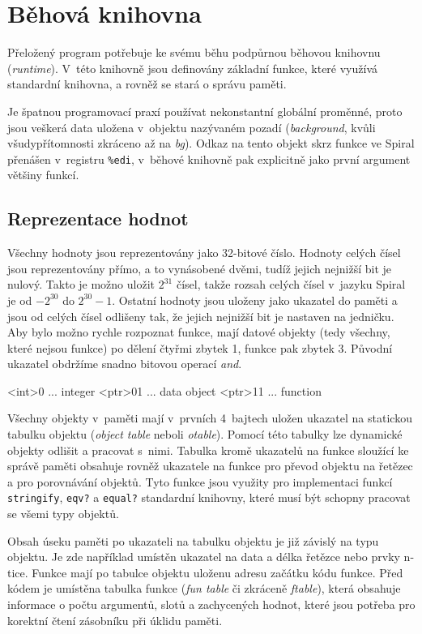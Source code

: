 \chapter{Běhová knihovna}

Přeložený program potřebuje ke svému běhu podpůrnou běhovou knihovnu
(\emph{runtime}). V~této knihovně jsou definovány základní funkce, které využívá
standardní knihovna, a rovněž se stará o správu paměti.

Je špatnou programovací praxí používat nekonstantní globální proměnné, proto
jsou veškerá  data uložena v~objektu nazývaném pozadí
(\emph{background}, kvůli všudypřítomnosti zkráceno až na \emph{bg}). Odkaz na
tento objekt skrz funkce ve Spiral přenášen v~registru \texttt{\%edi}, v~běhové
knihovně pak explicitně jako první argument většiny funkcí.

\section{Reprezentace hodnot}

Všechny hodnoty jsou reprezentovány jako 32-bitové číslo. Hodnoty celých čísel
jsou reprezentovány přímo, a to vynásobené dvěmi, tudíž jejich nejnižší bit je
nulový. Takto je možno uložit $2^{31}$ čísel, takže rozsah celých čísel v~jazyku
Spiral je od $-2^{30}$ do $2^{30}-1$. Ostatní hodnoty jsou uloženy jako ukazatel
do paměti a jsou od celých čísel odlišeny tak, že jejich nejnižší bit je
nastaven na jedničku. Aby bylo možno rychle rozpoznat funkce, mají datové
objekty (tedy všechny, které nejsou funkce) po dělení čtyřmi zbytek 1, funkce
pak zbytek 3.  Původní ukazatel obdržíme snadno bitovou operací \emph{and}.

\begin{ttcode}
   <int>0 ... integer
  <ptr>01 ... data object
  <ptr>11 ... function
\end{ttcode}

Všechny objekty v~paměti mají v~prvních 4~bajtech uložen ukazatel na statickou
tabulku objektu (\emph{object table} neboli \emph{otable}). Pomocí této tabulky
lze dynamické objekty odlišit a pracovat s~nimi. Tabulka kromě ukazatelů na
funkce sloužící ke správě paměti obsahuje rovněž ukazatele na funkce pro převod
objektu na řetězec a pro porovnávání objektů. Tyto funkce jsou využity pro
implementaci funkcí \texttt{stringify}, \texttt{eqv?} a \texttt{equal?}
standardní knihovny, které musí být schopny pracovat se všemi typy objektů.

Obsah úseku paměti po ukazateli na tabulku objektu je již závislý na typu
objektu. Je zde například umístěn ukazatel na data a délka řetězce nebo prvky
n-tice. Funkce mají po tabulce objektu uloženu adresu začátku kódu funkce. Před
kódem je umístěna tabulka funkce (\emph{fun table} či zkráceně \emph{ftable}),
která obsahuje informace o počtu argumentů, slotů a zachycených hodnot, které
jsou potřeba pro korektní čtení zásobníku při úklidu paměti.

